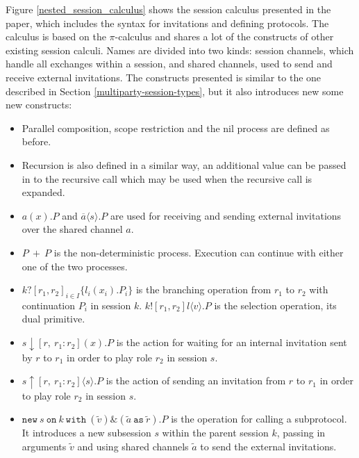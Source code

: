 \documentclass[12pt,twoside]{report}
\begin{document}
Figure \ref{nested_session_calculus} shows the session calculus presented in the paper, which includes the syntax for invitations and defining protocols. The calculus is based on the $\pi$-calculus and shares a lot of the constructs of other existing session calculi\cite{logicaassertions}. Names are divided into two kinds: session channels, which handle all exchanges within a session, and shared channels, used to send and receive external invitations. The constructs presented is similar to the one described in Section \ref{multiparty-session-types}, but it also introduces new some new constructs:
\begin{itemize}
    \item Parallel composition, scope restriction and the nil process are defined as before.
    \item Recursion is also defined in a similar way, an additional value can be passed in to the recursive call which may be used when the recursive call is expanded. 
    \item $a(x).P$ and $\overline{a}\langle s \rangle.P$ are used for receiving and sending external invitations over the shared channel $a$.
    \item $P\ +\ P$ is the non-deterministic process. Execution can continue with either one of the two processes.
    \item $k?[r_1, r_2]_{i \in I} \{l_i(x_i).P_i\}$ is the branching operation from $r_1$ to $r_2$ with continuation $P_i$ in session $k$. $k![r_1, r_2]l \langle v \rangle.P$ is the selection operation, its dual primitive. 
    \item $s \downarrow [r,\ r_1 : r_2](x).P$ is the action for waiting for an internal invitation sent by $r$ to $r_1$ in order to play role $r_2$ in session $s$. 
    \item $s \uparrow [r,\ r_1 : r_2]\langle s \rangle.P$ is the action of sending an invitation from $r$ to $r_1$ in order to play role $r_2$ in session $s$.
    \item $\texttt{new}\ s\ \texttt{on}\ k\ \texttt{with}\ (\widetilde{v})\&(\widetilde{a}\ \texttt{as}\ \widetilde{r}).P$ is the operation for calling a subprotocol. It introduces a new subsession $s$ within the parent session $k$, passing in arguments $\widetilde{v}$ and using shared channels $\widetilde{a}$ to send the external invitations.
\end{itemize}
\end{document}
